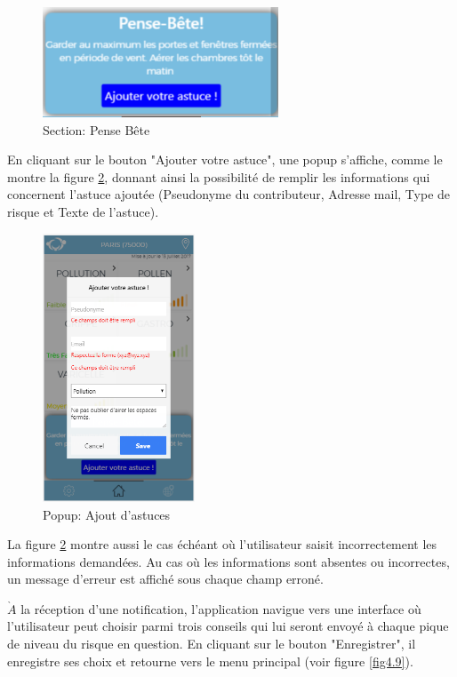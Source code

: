 \begin{figure}[!h]
	\begin{center}
		\includegraphics[width=7cm]{figures/pense_bete}
	\end{center}
	\caption{Section: Pense Bête}
	\label{fig4.7}
\end{figure}
\vspace{1cm}
En cliquant sur le bouton "Ajouter votre astuce", une popup s'affiche, comme le montre la figure \ref{fig4.8}, donnant ainsi la possibilité de remplir les informations qui concernent l'astuce ajoutée (Pseudonyme du contributeur, Adresse mail, Type de risque et Texte de l'astuce).

\begin{figure}[!h]
	\begin{center}
		\includegraphics[height=8cm]{figures/ajout_trick}
	\end{center}
	\caption{Popup: Ajout d'astuces}
	\label{fig4.8}
\end{figure}
\newpage
La figure \ref{fig4.8} montre aussi le cas échéant où l'utilisateur saisit incorrectement les informations demandées. Au cas où les informations sont absentes ou incorrectes, un message d'erreur est affiché sous chaque champ erroné.

\vspace{0.5cm}

$\grave{A}$ la réception d'une notification, l'application navigue vers une interface où l'utilisateur peut choisir parmi trois conseils qui lui seront envoyé à chaque pique de niveau du risque en question. En cliquant sur le bouton "Enregistrer", il enregistre ses choix et retourne vers le menu principal (voir figure \ref{fig4.9}).


